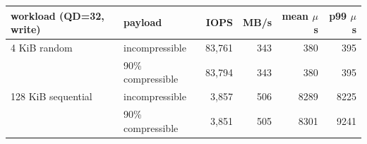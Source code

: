 \begin{tabular}{llrrrr}
\toprule
workload (QD=32, write) & payload & IOPS & MB/s & mean $\mu$s & p99 $\mu$s \\
\midrule
4 KiB random & incompressible & 83,761 & 343 & 380 & 395 \\
 & 90\% compressible & 83,794 & 343 & 380 & 395 \\
128 KiB sequential & incompressible & 3,857 & 506 & 8289 & 8225 \\
 & 90\% compressible & 3,851 & 505 & 8301 & 9241 \\
\bottomrule
\end{tabular}
